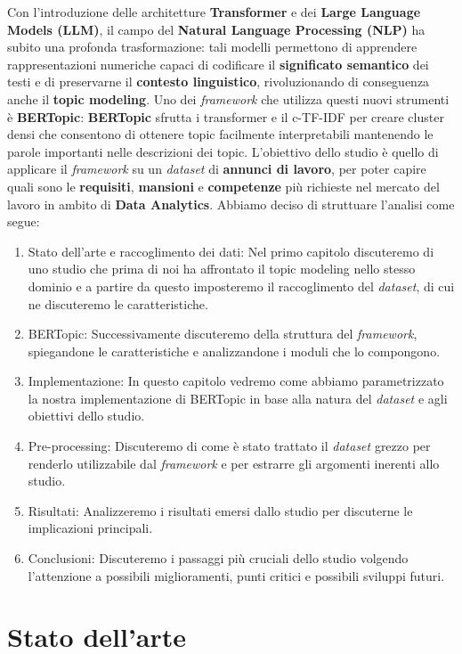 Con l’introduzione delle architetture \textbf{Transformer} e dei \textbf{Large Language Models (LLM)}, il campo del \textbf{Natural Language Processing (NLP)} ha subito una profonda trasformazione: tali modelli permettono di apprendere rappresentazioni numeriche capaci di codificare il \textbf{significato semantico} dei testi e di preservarne il \textbf{contesto linguistico}, rivoluzionando di conseguenza anche il \textbf{topic modeling}.
Uno dei \textit{framework} che utilizza questi nuovi strumenti è \textbf{BERTopic}:
\textbf{BERTopic} sfrutta i transformer e il c-TF-IDF per creare cluster densi che consentono di ottenere topic facilmente interpretabili mantenendo le parole importanti nelle descrizioni dei topic.
L'obiettivo dello studio è quello di applicare il \textit{framework} su un \textit{dataset} di \textbf{annunci di lavoro}, per poter capire quali sono le \textbf{requisiti}, \textbf{mansioni} e \textbf{competenze} più richieste nel mercato del lavoro in ambito di \textbf{Data Analytics}.
Abbiamo deciso di struttuare l'analisi come segue:
\begin{enumerate}
    \item Stato dell'arte e raccoglimento dei dati: Nel primo capitolo discuteremo di uno studio che prima di noi ha affrontato il topic modeling nello stesso dominio e a partire da questo imposteremo il raccoglimento del \textit{dataset}, di cui ne discuteremo le caratteristiche.
    \item BERTopic: Successivamente discuteremo della struttura del \textit{framework}, spiegandone le caratteristiche e analizzandone i moduli che lo compongono.
    \item Implementazione: In questo capitolo vedremo come abbiamo parametrizzato la nostra implementazione di BERTopic in base alla natura del \textit{dataset} e agli obiettivi dello studio.
    \item Pre-processing: Discuteremo di come è stato trattato il \textit{dataset} grezzo per renderlo utilizzabile dal \textit{framework} e per estrarre gli argomenti inerenti allo studio.
    \item Risultati: Analizzeremo i risultati emersi dallo studio per discuterne le implicazioni principali.
    \item Conclusioni: Discuteremo i passaggi più cruciali dello studio volgendo l'attenzione a possibili miglioramenti, punti critici e possibili sviluppi futuri.
\end{enumerate}

\section{Stato dell'arte}

